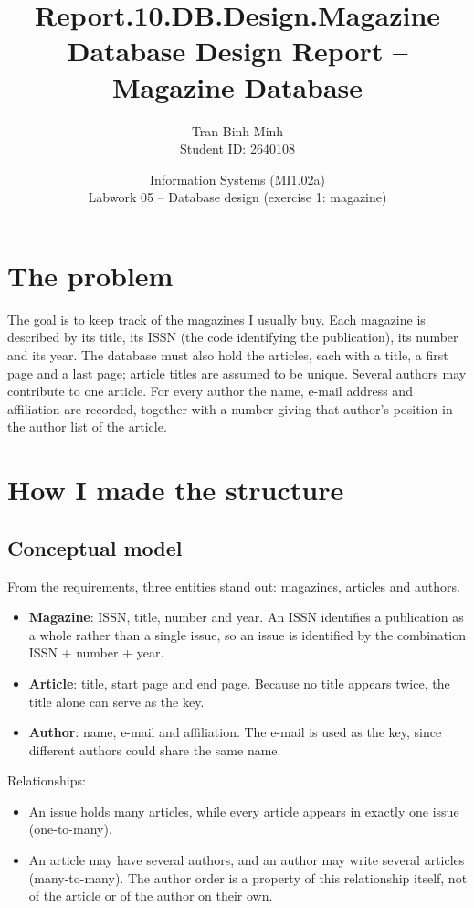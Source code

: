 \documentclass[11pt,a4paper]{article}
\title{\textbf{Report.10.DB.Design.Magazine}\\[0.3em]\large Database Design Report -- Magazine Database}
\author{Tran Binh Minh \\ Student ID: 2640108}
\date{Information Systems (MI1.02a) \\ Labwork 05 -- Database design (exercise 1: magazine)}
\begin{document}
\maketitle

\section{The problem}
The goal is to keep track of the magazines I usually buy. Each magazine is described by its title, its ISSN (the code identifying the publication), its number and its year. The database must also hold the articles, each with a title, a first page and a last page; article titles are assumed to be unique. Several authors may contribute to one article. For every author the name, e-mail address and affiliation are recorded, together with a number giving that author's position in the author list of the article.

\section{How I made the structure}

\subsection{Conceptual model}
From the requirements, three entities stand out: magazines, articles and authors.
\begin{itemize}
    \item \textbf{Magazine}: ISSN, title, number and year. An ISSN identifies a publication as a whole rather than a single issue, so an issue is identified by the combination ISSN + number + year.
    \item \textbf{Article}: title, start page and end page. Because no title appears twice, the title alone can serve as the key.
    \item \textbf{Author}: name, e-mail and affiliation. The e-mail is used as the key, since different authors could share the same name.
\end{itemize}

Relationships:
\begin{itemize}
    \item An issue holds many articles, while every article appears in exactly one issue (one-to-many).
    \item An article may have several authors, and an author may write several articles (many-to-many). The author order is a property of this relationship itself, not of the article or of the author on their own.
\end{itemize}
\end{document}
